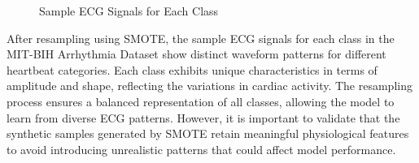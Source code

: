 \begin{figure}[H]
    \centering
        
    \caption{Sample ECG Signals for Each Class}
    \label{fig:ECGTrainFrequency}
\end{figure}

\indent After resampling using SMOTE, the sample ECG signals for each class in the MIT-BIH Arrhythmia Dataset show distinct waveform patterns for different heartbeat categories. Each class exhibits unique characteristics in terms of amplitude and shape, reflecting the variations in cardiac activity. The resampling process ensures a balanced representation of all classes, allowing the model to learn from diverse ECG patterns. However, it is important to validate that the synthetic samples generated by SMOTE retain meaningful physiological features to avoid introducing unrealistic patterns that could affect model performance.

\clearpage